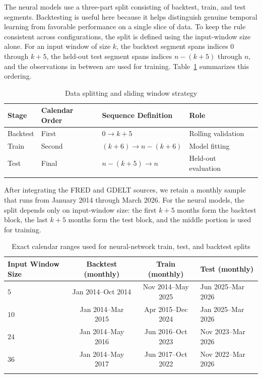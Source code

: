 \documentclass[pdflatex,sn-mathphys-num]{sn-jnl}%
\theoremstyle{thmstyleone}%
\theoremstyle{thmstyletwo}%
\theoremstyle{thmstylethree}%
\begin{document}
The neural models use a three-part split consisting of backtest, train, and test segments. Backtesting is useful here because it helps distinguish genuine temporal learning from favorable performance on a single slice of data. To keep the rule consistent across configurations, the split is defined using the input-window size alone. For an input window of size $k$, the backtest segment spans indices $0$ through $k+5$, the held-out test segment spans indices $n-(k+5)$ through $n$, and the observations in between are used for training. Table~\ref{tab:data_split_strategy} summarizes this ordering.

\begin{table}[h]
\caption{Data splitting and sliding window strategy}\label{tab:data_split_strategy}
\begin{tabular}{@{}lllll@{}}
\toprule
Stage & Calendar Order & Sequence Definition & Role \\
\midrule
Backtest & First & $0 \rightarrow k+5$ & Rolling validation \\
Train & Second & $(k+6) \rightarrow n-(k+6)$ & Model fitting \\
Test & Final & $n-(k+5) \rightarrow n$ & Held-out evaluation \\
\botrule
\end{tabular}
\end{table}

After integrating the FRED and GDELT sources, we retain a monthly sample that runs from January 2014 through March 2026. For the neural models, the split depends only on input-window size: the first $k+5$ months form the backtest block, the last $k+5$ months form the test block, and the middle portion is used for training.

\begin{table}[h]
\centering
\caption{Exact calendar ranges used for neural-network train, test, and backtest splits}
\label{tab:exact_split_dates}
\begin{tabular}{@{}p{3.2cm}ccp{5.5cm}@{}}
\toprule
Input Window Size & Backtest (monthly) & Train (monthly) & Test (monthly) \\
\midrule
$5$ & Jan 2014--Oct 2014 & Nov 2014--May 2025 & Jun 2025--Mar 2026 \\
$10$ & Jan 2014--Mar 2015 & Apr 2015--Dec 2024 & Jan 2025--Mar 2026 \\
$24$ & Jan 2014--May 2016 & Jun 2016--Oct 2023 & Nov 2023--Mar 2026 \\
$36$ & Jan 2014--May 2017 & Jun 2017--Oct 2022 & Nov 2022--Mar 2026 \\
\botrule
\end{tabular}
\end{table}
\end{document}
